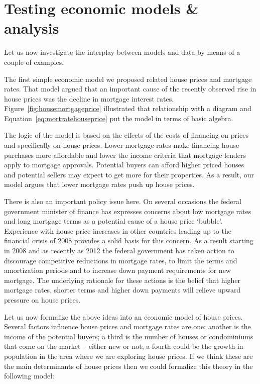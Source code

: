 \section{Testing economic models \& analysis}\label{sec:ch2sec23}

Let us now investigate the interplay between models and data by means of a couple of examples.

The first simple economic model we proposed related house prices and mortgage rates. That model argued that an important cause of the recently observed rise in house prices was the decline in mortgage interest rates. Figure~\ref{fig:housemortgageprice} illustrated that relationship with a diagram and Equation~\ref{eq:mortratehouseprice} put the model in terms of basic algebra.

The logic of the model is based on the effects of the costs of financing on prices and specifically on house prices. Lower mortgage rates make financing house purchases more affordable and lower the income criteria that mortgage lenders apply to mortgage approvals. Potential buyers can afford higher priced houses and potential sellers may expect to get more for their properties. As a result, our model argues that lower mortgage rates push up house prices.

There is also an important policy issue here. On several occasions the federal government minister of finance has expresses concerns about low mortgage rates and long mortgage terms as a potential cause of a house price `bubble'. Experience with house price increases in other countries leading up to the financial crisis of 2008 provides a solid basis for this concern. As a result starting in 2008 and as recently as 2012 the federal government has taken action to discourage competitive reductions in mortgage rates, to limit the terms and amortization periods and to increase down payment requirements for new mortgage. The underlying rationale for these actions is the belief that higher mortgage rates, shorter terms and higher down payments will relieve upward pressure on house prices. 

Let us now formalize the above ideas into an economic model of house prices. Several factors influence house prices and mortgage rates are one; another is the income of the potential buyers; a third is the number of houses or condominiums that come on the market -- either new or not; a fourth could be the growth in population in the area where we are exploring house prices. If we think these are the main determinants of house prices then we could formalize this theory in the following model: 

